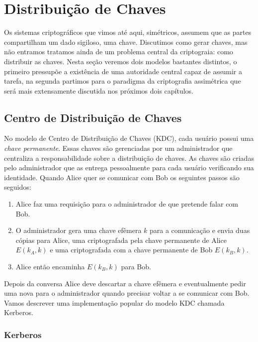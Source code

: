 \chapter{Distribuição de Chaves}
\label{cha:distribuicao-chaves}

Os sistemas criptográficos que vimos até aqui, simétricos, assumem que as partes compartilham um dado sigiloso, uma chave.
Discutimos como gerar chaves, mas não entramos tratamos ainda de um problema central da criptograia: como distribuir as chaves.
Nesta seção veremos dois modelos bastantes distintos, o primeiro pressupõe a existência de uma autoridade central capaz de assumir a tarefa, na segunda partimos para o paradigma da criptografia assimétrica que será mais extensamente discutida nos próximos dois capítulos.

\section{Centro de Distribuição de Chaves}
\label{sec:kdc}

No modelo de Centro de Distribuição de Chaves (KDC), cada usuário possui uma {\em chave permanente}.
Essas chaves são gerenciadas por um administrador que centraliza a responsabilidade sobre a distribuição de chaves.
As chaves são criadas pelo administrador que as entrega pessoalmente para cada usuário verificando sua identidade.
Quando Alice quer se comunicar com Bob os seguintes passos são seguidos:

\begin{enumerate}
\item Alice faz uma requisição para o administrador de que pretende falar com Bob.
\item O administrador gera uma chave efêmera $k$ para a comunicação e envia duas cópias para Alice, uma criptografada pela chave permanente de Alice $E(k_A, k)$ e uma criptografada com a chave permanente de Bob $E(k_B, k)$.
\item Alice então encaminha $E(k_B, k)$ para Bob.
\end{enumerate}

Depois da conversa Alice deve descartar a chave efêmera e eventualmente pedir uma nova para o administrador quando precisar voltar a se comunicar com Bob.
Vamos descrever uma implementação popular do modelo KDC chamada Kerberos.


\subsection{Kerberos}
\label{sec:kerberos}

